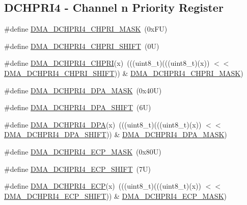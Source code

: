 \subsection*{D\+C\+H\+P\+R\+I4 -\/ Channel n Priority Register}
\begin{DoxyCompactItemize}
\item 
\#define \mbox{\hyperlink{group___d_m_a___register___masks_ga87796e0046313ec4aaf1b839a5e60dcf}{D\+M\+A\+\_\+\+D\+C\+H\+P\+R\+I4\+\_\+\+C\+H\+P\+R\+I\+\_\+\+M\+A\+SK}}~(0x\+F\+U)
\item 
\#define \mbox{\hyperlink{group___d_m_a___register___masks_gad164e5f8091a94ef38abd6570d97b761}{D\+M\+A\+\_\+\+D\+C\+H\+P\+R\+I4\+\_\+\+C\+H\+P\+R\+I\+\_\+\+S\+H\+I\+FT}}~(0\+U)
\item 
\#define \mbox{\hyperlink{group___d_m_a___register___masks_gabd84d94a94b70b261a2a49660f0035e9}{D\+M\+A\+\_\+\+D\+C\+H\+P\+R\+I4\+\_\+\+C\+H\+P\+RI}}(x)~(((uint8\+\_\+t)(((uint8\+\_\+t)(x)) $<$$<$ \mbox{\hyperlink{group___d_m_a___register___masks_gad164e5f8091a94ef38abd6570d97b761}{D\+M\+A\+\_\+\+D\+C\+H\+P\+R\+I4\+\_\+\+C\+H\+P\+R\+I\+\_\+\+S\+H\+I\+FT}})) \& \mbox{\hyperlink{group___d_m_a___register___masks_ga87796e0046313ec4aaf1b839a5e60dcf}{D\+M\+A\+\_\+\+D\+C\+H\+P\+R\+I4\+\_\+\+C\+H\+P\+R\+I\+\_\+\+M\+A\+SK}})
\item 
\#define \mbox{\hyperlink{group___d_m_a___register___masks_gaf4a7bab4a376e47cbcc44e02cff09748}{D\+M\+A\+\_\+\+D\+C\+H\+P\+R\+I4\+\_\+\+D\+P\+A\+\_\+\+M\+A\+SK}}~(0x40\+U)
\item 
\#define \mbox{\hyperlink{group___d_m_a___register___masks_ga62b07715af664512e04bc2b02ca12993}{D\+M\+A\+\_\+\+D\+C\+H\+P\+R\+I4\+\_\+\+D\+P\+A\+\_\+\+S\+H\+I\+FT}}~(6\+U)
\item 
\#define \mbox{\hyperlink{group___d_m_a___register___masks_ga833ecda0d298c388f8a05bde546acba9}{D\+M\+A\+\_\+\+D\+C\+H\+P\+R\+I4\+\_\+\+D\+PA}}(x)~(((uint8\+\_\+t)(((uint8\+\_\+t)(x)) $<$$<$ \mbox{\hyperlink{group___d_m_a___register___masks_ga62b07715af664512e04bc2b02ca12993}{D\+M\+A\+\_\+\+D\+C\+H\+P\+R\+I4\+\_\+\+D\+P\+A\+\_\+\+S\+H\+I\+FT}})) \& \mbox{\hyperlink{group___d_m_a___register___masks_gaf4a7bab4a376e47cbcc44e02cff09748}{D\+M\+A\+\_\+\+D\+C\+H\+P\+R\+I4\+\_\+\+D\+P\+A\+\_\+\+M\+A\+SK}})
\item 
\#define \mbox{\hyperlink{group___d_m_a___register___masks_ga1d848e32bb5131ea22811b9165d83d44}{D\+M\+A\+\_\+\+D\+C\+H\+P\+R\+I4\+\_\+\+E\+C\+P\+\_\+\+M\+A\+SK}}~(0x80\+U)
\item 
\#define \mbox{\hyperlink{group___d_m_a___register___masks_gac5f10de0dfe7e5561053741e9e38e371}{D\+M\+A\+\_\+\+D\+C\+H\+P\+R\+I4\+\_\+\+E\+C\+P\+\_\+\+S\+H\+I\+FT}}~(7\+U)
\item 
\#define \mbox{\hyperlink{group___d_m_a___register___masks_ga07151b2dd48701e4ce261d4301215cee}{D\+M\+A\+\_\+\+D\+C\+H\+P\+R\+I4\+\_\+\+E\+CP}}(x)~(((uint8\+\_\+t)(((uint8\+\_\+t)(x)) $<$$<$ \mbox{\hyperlink{group___d_m_a___register___masks_gac5f10de0dfe7e5561053741e9e38e371}{D\+M\+A\+\_\+\+D\+C\+H\+P\+R\+I4\+\_\+\+E\+C\+P\+\_\+\+S\+H\+I\+FT}})) \& \mbox{\hyperlink{group___d_m_a___register___masks_ga1d848e32bb5131ea22811b9165d83d44}{D\+M\+A\+\_\+\+D\+C\+H\+P\+R\+I4\+\_\+\+E\+C\+P\+\_\+\+M\+A\+SK}})
\end{DoxyCompactItemize}
